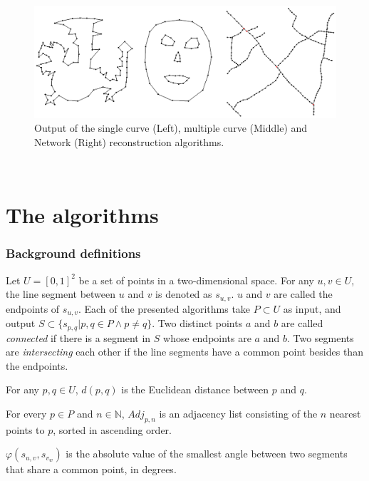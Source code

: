 \documentclass[11pt]{article}
\begin{document}
\begin{figure}[ht!]
\centering
\includegraphics[scale=0.3]{images/outputOverview.png}
\caption{Output of the single curve (Left), multiple curve (Middle) and Network (Right) reconstruction algorithms.}
\label{outputOverview}
\end{figure}$ $\\


\section{The algorithms}
\label{se:algorithms}
\subsubsection{Background definitions}
Let $U = [0,1]^2$ be a set of points in a two-dimensional space.
For any $u,v \in U$, the line segment between $u$ and $v$ is denoted as $s_{u,v}$. $u$ and $v$ are called the endpoints of $s_{u,v}$. Each of the presented algorithms take $P \subset U$ as input, and output $S \subset \{s_{p,q} | p,q \in P \land p \neq q \}$.
 Two distinct points $a$ and $b$ are called \textit{connected} if there is a segment in $S$ whose endpoints are $a$ and $b$.
 Two segments are \textit{intersecting} each other if the line segments have a common point besides than the endpoints.

For any $p,q \in U$, $d(p,q)$ is the Euclidean distance between $p$ and $q$. %

For every $p \in P$ and $n \in \mathbb{N}$, $Adj_{p,n}$ is an adjacency list consisting of the $n$ nearest points to $p$, sorted in ascending order.

$\varphi(s_{u,v}, s_{v_w})$ is the absolute value of the smallest angle between two segments that share a common point, in degrees.
\end{document}
